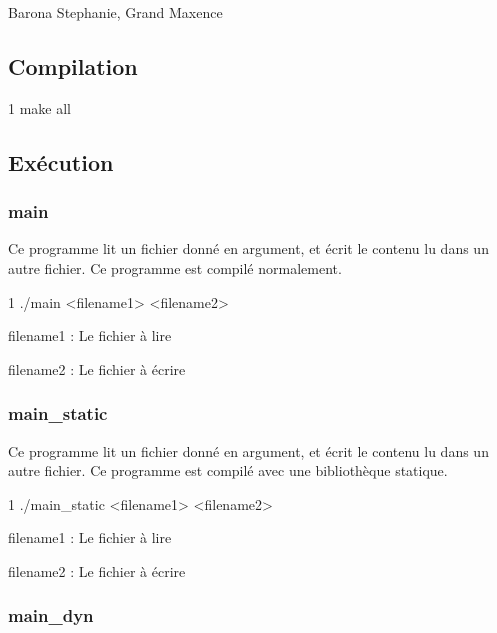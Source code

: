 Barona Stephanie, Grand Maxence

\subsection*{Compilation}


\begin{DoxyCode}
1 make all
\end{DoxyCode}


\subsection*{Exécution}

\subsubsection*{main}

Ce programme lit un fichier donné en argument, et écrit le contenu lu dans un autre fichier. Ce programme est compilé normalement.


\begin{DoxyCode}
1 ./main <filename1> <filename2>
\end{DoxyCode}

\begin{DoxyItemize}
\item filename1 \+: Le fichier à lire
\item filename2 \+: Le fichier à écrire
\end{DoxyItemize}

\subsubsection*{main\+\_\+static}

Ce programme lit un fichier donné en argument, et écrit le contenu lu dans un autre fichier. Ce programme est compilé avec une bibliothèque statique.


\begin{DoxyCode}
1 ./main\_static <filename1> <filename2>
\end{DoxyCode}

\begin{DoxyItemize}
\item filename1 \+: Le fichier à lire
\item filename2 \+: Le fichier à écrire
\end{DoxyItemize}

\subsubsection*{main\+\_\+dyn}


